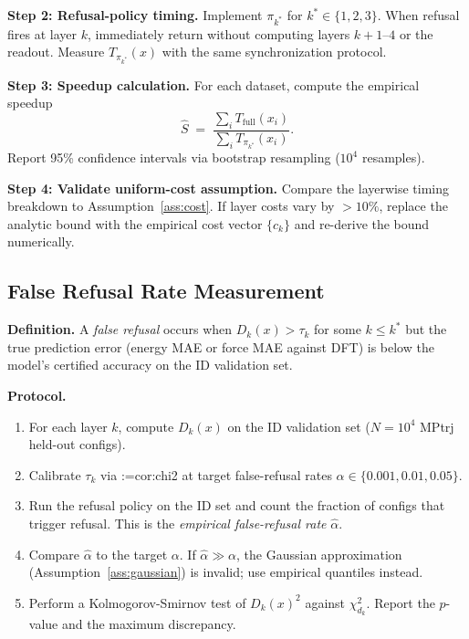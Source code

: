 \documentclass[11pt,a4paper]{article}
\makeatletter
\newcommand{\cref}[1]{\begingroup\def\crefsep{}\@for\crefitem:=#1\do{\crefsep\ref{\crefitem}\def\crefsep{, }}\endgroup}
\makeatother
\begin{document}
\textbf{Step 2: Refusal-policy timing.} Implement $\pi_{k^*}$ for $k^*\in\{1,2,3\}$. When refusal fires at layer $k$, immediately return without computing layers $k+1$--$4$ or the readout. Measure $T_{\pi_{k^*}}(x)$ with the same synchronization protocol.

\textbf{Step 3: Speedup calculation.} For each dataset, compute the empirical speedup
\begin{equation}
    \hat S \;=\; \frac{\sum_i T_{\text{full}}(x_i)}{\sum_i T_{\pi_{k^*}}(x_i)}.
\end{equation}
Report 95\% confidence intervals via bootstrap resampling ($10^4$ resamples).

\textbf{Step 4: Validate uniform-cost assumption.} Compare the layerwise timing breakdown to Assumption~\ref{ass:cost}. If layer costs vary by $>10\%$, replace the analytic bound with the empirical cost vector $\{c_k\}$ and re-derive the bound numerically.

\subsection{False Refusal Rate Measurement}\label{sec:empirical:false}

\textbf{Definition.} A \emph{false refusal} occurs when $D_k(x)>\tau_k$ for some $k\le k^*$ but the true prediction error (energy MAE or force MAE against DFT) is below the model's certified accuracy on the ID validation set.

\textbf{Protocol.}
\begin{enumerate}
    \item For each layer $k$, compute $D_k(x)$ on the ID validation set ($N=10^4$ MPtrj held-out configs).
    \item Calibrate $\tau_k$ via \cref{cor:chi2} at target false-refusal rates $\alpha\in\{0.001,0.01,0.05\}$.
    \item Run the refusal policy on the ID set and count the fraction of configs that trigger refusal. This is the \emph{empirical false-refusal rate} $\hat\alpha$.
    \item Compare $\hat\alpha$ to the target $\alpha$. If $\hat\alpha\gg\alpha$, the Gaussian approximation (Assumption~\ref{ass:gaussian}) is invalid; use empirical quantiles instead.
    \item Perform a Kolmogorov-Smirnov test of $D_k(x)^2$ against $\chi^2_{d_k}$. Report the $p$-value and the maximum discrepancy.
\end{enumerate}
\end{document}

